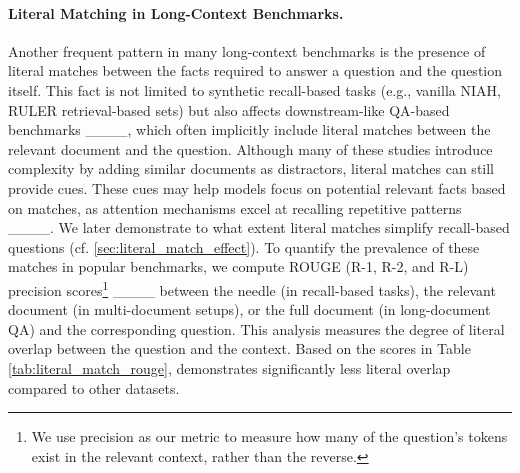 
\paragraph{Literal Matching in Long-Context Benchmarks.}
\label{sec:related_literal_matching}
Another frequent pattern in many long-context benchmarks is the presence of literal matches between the facts required to answer a question and the question itself. This fact is not limited to synthetic recall-based tasks (e.g., vanilla NIAH, RULER retrieval-based sets) but also affects downstream-like QA-based benchmarks ____, which often implicitly include literal matches between the relevant document and the question. Although many of these studies introduce complexity by adding similar documents as distractors, literal matches can still provide cues. These cues may help models focus on potential relevant facts based on matches, as attention mechanisms excel at recalling repetitive patterns ____.
We later demonstrate to what extent literal matches simplify recall-based questions (cf. \ref{sec:literal_match_effect}). To quantify the prevalence of these matches in popular benchmarks, we compute ROUGE (R-1, R-2, and R-L) precision scores\footnote{We use precision as our metric to measure how many of the question's tokens exist in the relevant context, rather than the reverse.} ____ between the needle (in recall-based tasks), the relevant document (in multi-document setups), or the full document (in long-document QA) and the corresponding question. This analysis measures the degree of literal overlap between the question and the context.
Based on the scores in Table \ref{tab:literal_match_rouge}, \framework demonstrates significantly less literal overlap compared to other datasets.